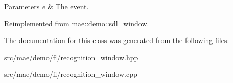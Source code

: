 \begin{DoxyParams}{Parameters}
{\em e} & The event. \\
\hline
\end{DoxyParams}


Reimplemented from \hyperlink{classmae_1_1demo_1_1sdl__window_a3e9093b89993ebd52acbbc5d247750b8}{mae\-::demo\-::sdl\-\_\-window}.



The documentation for this class was generated from the following files\-:\begin{DoxyCompactItemize}
\item 
src/mae/demo/fl/recognition\-\_\-window.\-hpp\item 
src/mae/demo/fl/recognition\-\_\-window.\-cpp\end{DoxyCompactItemize}
